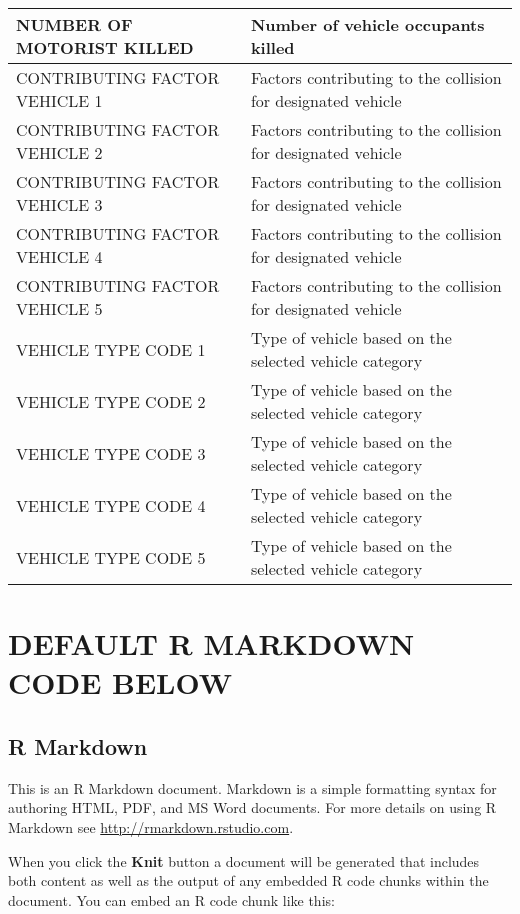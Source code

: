\begin{table}
\begin{tabular}[t]{l|l}
\hline
NUMBER OF MOTORIST KILLED & Number of vehicle occupants killed\\
\hline
CONTRIBUTING FACTOR VEHICLE 1 & Factors contributing to the collision for designated vehicle\\
\hline
CONTRIBUTING FACTOR VEHICLE 2 & Factors contributing to the collision for designated vehicle\\
\hline
CONTRIBUTING FACTOR VEHICLE 3 & Factors contributing to the collision for designated vehicle\\
\hline
CONTRIBUTING FACTOR VEHICLE 4 & Factors contributing to the collision for designated vehicle\\
\hline
CONTRIBUTING FACTOR VEHICLE 5 & Factors contributing to the collision for designated vehicle\\
\hline
VEHICLE TYPE CODE 1 & Type of vehicle based on the selected vehicle category\\
\hline
VEHICLE TYPE CODE 2 & Type of vehicle based on the selected vehicle category\\
\hline
VEHICLE TYPE CODE 3 & Type of vehicle based on the selected vehicle category\\
\hline
VEHICLE TYPE CODE 4 & Type of vehicle based on the selected vehicle category\\
\hline
VEHICLE TYPE CODE 5 & Type of vehicle based on the selected vehicle category\\
\hline
\end{tabular}
\end{table}

\hypertarget{default-r-markdown-code-below}{%
\section{DEFAULT R MARKDOWN CODE
BELOW}\label{default-r-markdown-code-below}}

\hypertarget{r-markdown}{%
\subsection{R Markdown}\label{r-markdown}}

This is an R Markdown document. Markdown is a simple formatting syntax
for authoring HTML, PDF, and MS Word documents. For more details on
using R Markdown see \url{http://rmarkdown.rstudio.com}.

When you click the \textbf{Knit} button a document will be generated
that includes both content as well as the output of any embedded R code
chunks within the document. You can embed an R code chunk like this:

